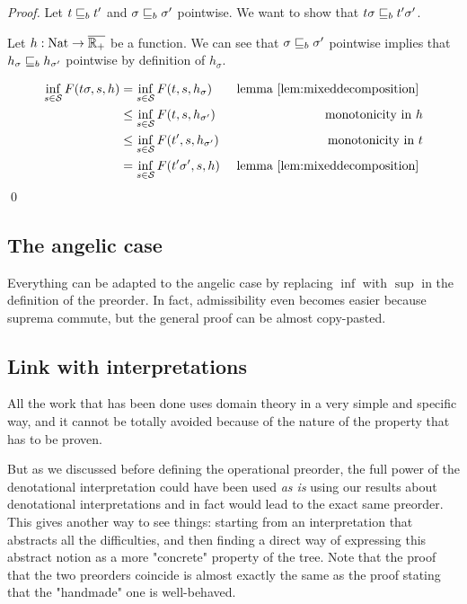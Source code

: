 \begin{ensps}
    \begin{proof}
        Let $t \sqsubseteq_b t'$ and $\sigma \sqsubseteq_b \sigma'$ pointwise.
        We want to show that $t\sigma \sqsubseteq_b t' \sigma'$. 

        Let $h : \textnormal{Nat} \to \overline{\mathbb{R}_+}$ be a function.
        We can see that $\sigma \sqsubseteq_b \sigma'$ pointwise 
        implies that $h_\sigma \sqsubseteq_b h_{\sigma'}$ pointwise 
        by definition of $h_\sigma$.


        \begin{align*}
            \inf_{s \in \mathcal{S}} F(t\sigma, s, h)  
            &= \inf_{s \in \mathcal{S}} F(t, s, h_\sigma) 
            &\text{ lemma \ref{lem:mixeddecomposition} } \\
            &\leq \inf_{s \in \mathcal{S}} F(t, s, h_{\sigma'})  & \text{ monotonicity in } h\\
            &\leq \inf_{s \in \mathcal{S}} F(t',s, h_{\sigma'}) & \text{ monotonicity in } t \\
            &= \inf_{s \in \mathcal{S}} F(t'\sigma', s,h )
            &\text{ lemma \ref{lem:mixeddecomposition} } \\
        \end{align*}
    \qed
    \end{proof}
\end{ensps}

\subsection{The angelic case}

Everything can be adapted to the angelic case by replacing 
$\inf$ with $\sup$ in the definition of the preorder. In fact,
admissibility even becomes easier because suprema commute, 
but the general proof can be almost copy-pasted.

\subsection{Link with interpretations}

All the work that has been done uses domain theory in a very 
simple and specific way, and it cannot be totally avoided 
because of the nature of the property that has to be proven.

But as we discussed before defining the operational preorder,
the full power of the denotational interpretation could have 
been used \emph{as is} using our results about denotational
interpretations and in fact would lead to the exact same preorder.
This gives another way to see things: starting from 
an interpretation that abstracts all the difficulties,
and then finding a direct way of expressing this 
abstract notion as a more "concrete" property of the tree.
Note that the proof that the two preorders coincide 
is almost exactly the same as the proof stating that 
the "handmade" one is well-behaved.



